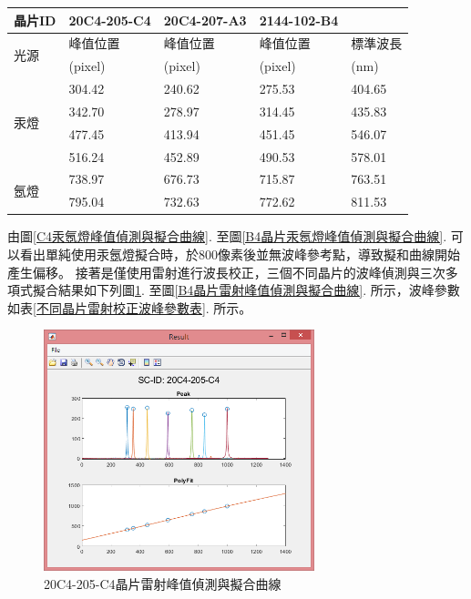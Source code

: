 \begin{center}
	\vspace{0.8cm}
	\label{不同晶片校正波峰參數表}
\begin{tabularx}{\textwidth}{m{}<{\centering}m{}<{\centering}m{}<{\centering}m{}<{\centering}m{}<{\centering}}
	\hline\hline
	晶片ID&20C4-205-C4&20C4-207-A3&2144-102-B4&\\
	\hline
	\multirow{2}{*}{光源}
	&峰值位置&峰值位置&峰值位置&標準波長\\
	&(pixel)&(pixel)&(pixel)&(nm)\\
	\hline
	\multirow{4}{*}{汞燈 }
	&304.42&240.62 &275.53 &404.65\\
	&342.70&278.97 &314.45 &435.83\\
	&477.45&413.94 &451.45 &546.07\\
	&516.24&452.89 &490.53 &578.01\\
	\hline
	\multirow{2}{*}{氬燈 }
	&738.97&676.73 &715.87 &763.51\\
	&795.04&732.63 &772.62 &811.53\\ 
	\hline\hline
\end{tabularx}
\vspace{10pt}
\end{center}
\par
由圖\ref{C4汞氬燈峰值偵測與擬合曲線}. 至圖\ref{B4晶片汞氬燈峰值偵測與擬合曲線}. 可以看出單純使用汞氬燈擬合時，於800像素後並無波峰參考點，導致擬和曲線開始產生偏移。
接著是僅使用雷射進行波長校正，三個不同晶片的波峰偵測與三次多項式擬合結果如下列圖\ref{C4晶片雷射峰值偵測與擬合曲線}. 至圖\ref{B4晶片雷射峰值偵測與擬合曲線}. 所示，波峰參數如表\ref{不同晶片雷射校正波峰參數表}. 所示。
\begin{figure}[H] %
	\centering %
	\vspace{0.8cm}
	\includegraphics[width=0.7\textwidth]{figures/Result/比較/C4-L.jpg} %
	\caption{20C4-205-C4晶片雷射峰值偵測與擬合曲線} %
	\label{C4晶片雷射峰值偵測與擬合曲線} %
\end{figure}
